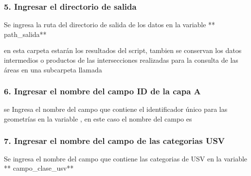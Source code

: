 \documentclass[letterpaper,10pt,spanish]{sphinxmanual}
\begin{document}
\subsubsection{5. Ingresar el directorio de salida}
\label{\detokenize{nivel_geometrias:ingresar-el-directorio-de-salida}}
Se ingresa la ruta del directorio de salida de los datos en la variable
** path\_salida**

\begin{sphinxVerbatim}[commandchars=\\\{\}]
  
\end{sphinxVerbatim}

en esta carpeta estarán los resultados del script, tambien se conservan los datos
intermedios o productos de las intersecciones realizadas para la consulta de las áreas
en una subcarpeta llamada 


\subsubsection{6. Ingresar el nombre del campo ID de la capa A}
\label{\detokenize{nivel_geometrias:ingresar-el-nombre-del-campo-id-de-la-capa-a}}
se Ingresa el nombre del campo que contiene el identificador único
para las geometrías en la variable , en este caso el nombre del campo  es 

\begin{sphinxVerbatim}[commandchars=\\\{\}]
  
\end{sphinxVerbatim}


\subsubsection{7. Ingresar el nombre del campo de las categorias USV}
\label{\detokenize{nivel_geometrias:ingresar-el-nombre-del-campo-de-las-categorias-usv}}
Se ingresa el nombre del campo que contiene las categorias de USV en la
variable ** campo\_clase\_usv**

\begin{sphinxVerbatim}[commandchars=\\\{\}]
  
\end{sphinxVerbatim}
\end{document}
